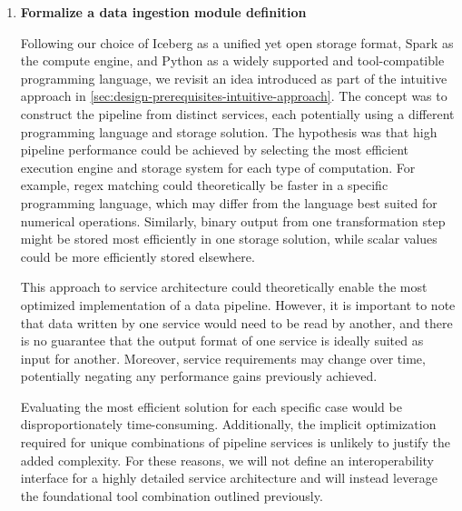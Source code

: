 \begin{enumerate}
    \item \textbf{Formalize a data ingestion module definition}

    Following our choice of Iceberg as a unified yet open storage format, Spark as the compute engine, and Python as a widely supported and tool-compatible programming language, we revisit an idea introduced as part of the intuitive approach in \cref{sec:design-prerequisites-intuitive-approach}.
    The concept was to construct the pipeline from distinct services, each potentially using a different programming language and storage solution.
    The hypothesis was that high pipeline performance could be achieved by selecting the most efficient execution engine and storage system for each type of computation.
    For example, regex matching could theoretically be faster in a specific programming language, which may differ from the language best suited for numerical operations.
    Similarly, binary output from one transformation step might be stored most efficiently in one storage solution, while scalar values could be more efficiently stored elsewhere.

    This approach to service architecture could theoretically enable the most optimized implementation of a data pipeline.
    However, it is important to note that data written by one service would need to be read by another, and there is no guarantee that the output format of one service is ideally suited as input for another.
    Moreover, service requirements may change over time, potentially negating any performance gains previously achieved.

    Evaluating the most efficient solution for each specific case would be disproportionately time-consuming.
    Additionally, the implicit optimization required for unique combinations of pipeline services is unlikely to justify the added complexity.
    For these reasons, we will not define an interoperability interface for a highly detailed service architecture and will instead leverage the foundational tool combination outlined previously.
\end{enumerate}
